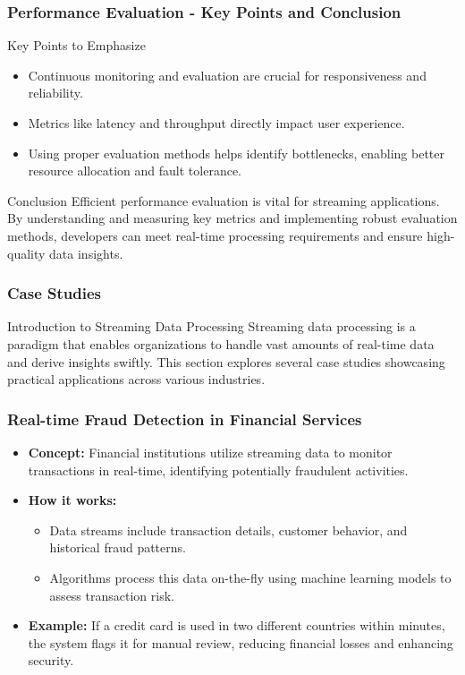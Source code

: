 \documentclass[aspectratio=169]{beamer}
\begin{document}
\begin{frame}[fragile]
    \frametitle{Performance Evaluation - Key Points and Conclusion}
    \begin{block}{Key Points to Emphasize}
        \begin{itemize}
            \item Continuous monitoring and evaluation are crucial for responsiveness and reliability.
            \item Metrics like latency and throughput directly impact user experience.
            \item Using proper evaluation methods helps identify bottlenecks, enabling better resource allocation and fault tolerance.
        \end{itemize}
    \end{block}

    \begin{block}{Conclusion}
        Efficient performance evaluation is vital for streaming applications. By understanding and measuring key metrics and implementing robust evaluation methods, developers can meet real-time processing requirements and ensure high-quality data insights.
    \end{block}
\end{frame}

\begin{frame}[fragile]
    \frametitle{Case Studies}
    \begin{block}{Introduction to Streaming Data Processing}
        Streaming data processing is a paradigm that enables organizations to handle vast amounts of real-time data and derive insights swiftly. This section explores several case studies showcasing practical applications across various industries.
    \end{block}
\end{frame}

\begin{frame}[fragile]
    \frametitle{Real-time Fraud Detection in Financial Services}
    \begin{itemize}
        \item \textbf{Concept:} 
        Financial institutions utilize streaming data to monitor transactions in real-time, identifying potentially fraudulent activities.
        
        \item \textbf{How it works:} 
        \begin{itemize}
            \item Data streams include transaction details, customer behavior, and historical fraud patterns.
            \item Algorithms process this data on-the-fly using machine learning models to assess transaction risk.
        \end{itemize}
        
        \item \textbf{Example:} 
        If a credit card is used in two different countries within minutes, the system flags it for manual review, reducing financial losses and enhancing security.
    \end{itemize}
\end{frame}
\end{document}
